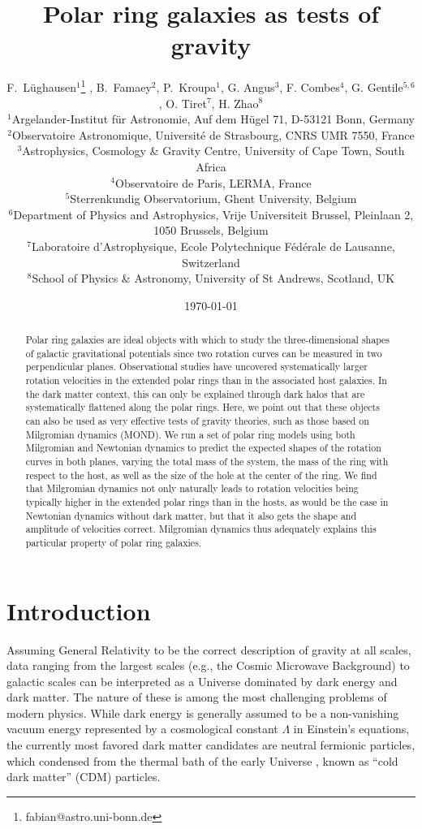 \documentclass[useAMS,usenatbib]{mn2e}
\title{Polar ring galaxies as tests of gravity}
\author[F. L\"ughausen et al.]
{F.~L\"ughausen$^1$\thanks{fabian@astro.uni-bonn.de} ,
B.~Famaey$^2$,
P.~Kroupa$^1$,
G. Angus$^3$,
F. Combes$^4$,
G. Gentile$^{5,6}$,
\newauthor 
O. Tiret$^7$,
H. Zhao$^8$
\\
$^1$Argelander-Institut f\"ur Astronomie, Auf dem H\"ugel 71, D-53121 Bonn, Germany\\
$^2$Observatoire Astronomique, Universit\'e de Strasbourg, CNRS UMR 7550, France\\
$^3$Astrophysics, Cosmology \& Gravity Centre, University of Cape Town, South Africa\\
$^4$Observatoire de Paris, LERMA, France\\
$^5$Sterrenkundig Observatorium, Ghent University, Belgium\\
$^6$Department of Physics and Astrophysics, Vrije Universiteit Brussel, Pleinlaan 2, 1050 Brussels, Belgium\\
$^7$Laboratoire d'Astrophysique, Ecole Polytechnique F\'ed\'erale de Lausanne, Switzerland\\
$^8$School of Physics \& Astronomy, University of St Andrews, Scotland, UK}
\begin{document}
\date{\today}
\maketitle

\begin{abstract}
Polar ring galaxies are ideal objects with which to study the three-dimensional shapes of galactic gravitational potentials since two rotation curves can be measured in two perpendicular planes. Observational studies have uncovered systematically larger rotation velocities in the extended polar rings than in the associated host galaxies. In the dark matter context, this can only be explained through dark halos that are systematically flattened along the polar rings. Here, we point out that these objects can also be used as very effective tests of gravity theories, such as those based on Milgromian dynamics (MOND). We run a set of polar ring models using both Milgromian and Newtonian dynamics to predict the expected shapes of the rotation curves in both planes, varying the total mass of the system, the mass of the ring with respect to the host, as well as the size of the hole at the center of the ring. 
We find that Milgromian dynamics not only naturally leads to rotation velocities being typically higher in the extended polar rings than in the hosts, as would be the case in Newtonian dynamics without dark matter, but that it also gets the shape and amplitude of velocities correct. Milgromian dynamics thus adequately explains this particular property of polar ring galaxies.
\end{abstract}


\section{Introduction}
Assuming General Relativity to be the correct description of gravity at all scales, data ranging from the largest scales (e.g., the Cosmic Microwave Background) to galactic scales can be interpreted as a Universe dominated by dark energy and dark matter. The nature of these is among the most challenging problems of modern physics. While dark energy is generally assumed to be a non-vanishing vacuum energy represented by a cosmological constant $\Lambda$ in Einstein's equations, the currently most favored dark matter candidates are neutral fermionic particles, which condensed from the thermal bath of the early Universe \citep{Bertone2005,Strigari2012}, known as ``cold dark matter'' (CDM) particles. 
\end{document}
